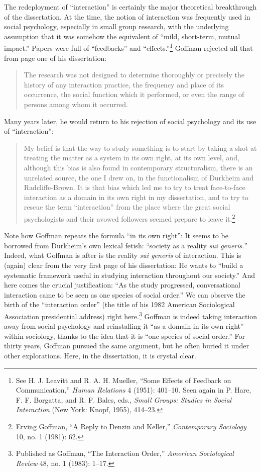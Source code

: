 \documentclass[openany,nobib]{tufte-book}
\begin{document}
The redeployment of ``interaction'' is certainly the major theoretical
breakthrough of the dissertation. At the time, the notion of interaction
was frequently used in social psychology, especially in small group
research, with the underlying assumption that it was somehow the
equivalent of ``mild, short-term, mutual impact.'' Papers were full of
``feedbacks'' and ``effects.''\footnote{See H. J. Leavitt and R. A. H.
  Mueller, ``Some Effects of Feedback on Communication,'' \emph{Human
  Relations} 4 (1951): 401--10. Seen again in P. Hare, F. F. Borgatta,
  and R. F. Bales, eds., \emph{Small Groups: Studies in Social
  Interaction} (New York: Knopf, 1955), 414--23.} Goffman rejected all
that from page one of his dissertation:

\begin{quote}
The research was not designed to determine thoroughly or precisely the
history of any interaction practice, the frequency and place of its
occurrence, the social function which it performed, or even the range of
persons among whom it occurred.
\end{quote}

\noindent Many years later, he would return to his rejection of social psychology
and its use of ``interaction'':

\begin{quote}
My belief is that the way to study something is to start by taking a
shot at treating the matter as a system in its own right, at its own
level, and, although this bias is also found in contemporary
structuralism, there is an unrelated source, the one I drew on, in the
functionalism of Durkheim and Radcliffe-Brown. It is that bias which led
me to try to treat face-to-face interaction as a domain in its own right
in my dissertation, and to try to rescue the term ``interaction'' from
the place where the great social psychologists and their avowed
followers seemed prepare to leave it.\footnote{Erving Goffman, ``A Reply
  to Denzin and Keller,'' \emph{Contemporary Sociology} 10, no. 1
  (1981): 62.}
\end{quote}

\noindent Note how Goffman repeats the formula ``in its own right'': It seems to
be borrowed from Durkheim's own lexical fetish: ``society as a reality
\emph{sui generis.}'' Indeed, what Goffman is after is the reality
\emph{sui generis} of interaction. This is (again) clear from the very
first page of his dissertation: He wants to ``build a systematic
framework useful in studying interaction throughout our society.'' And
here comes the crucial justification: ``As the study progressed,
conversational interaction came to be seen as one species of social
order.'' We can observe the birth of the ``interaction order'' (the
title of his 1982 American Sociological Association presidential
address) right here.\footnote{Published as Goffman, ``The Interaction
  Order,'' \emph{American Sociological Review} 48, no. 1 (1983): 1--17.}
Goffman is indeed taking interaction away from social psychology and
reinstalling it ``as a domain in its own right'' within sociology,
thanks to the idea that it is ``one species of social order.'' For
thirty years, Goffman pursued the same argument, but he often buried it
under other explorations. Here, in the dissertation, it is crystal
clear.
\end{document}
